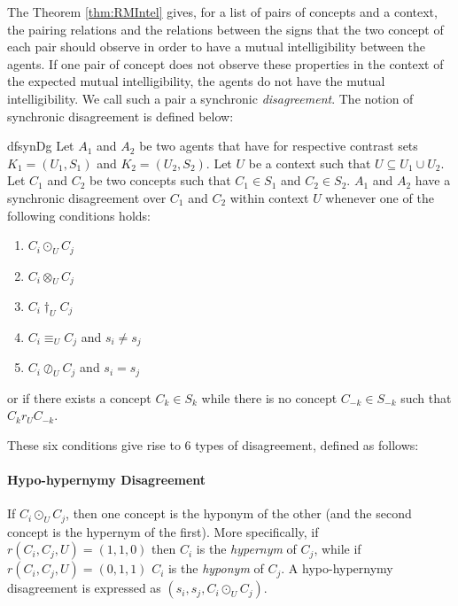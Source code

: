 The Theorem \ref{thm:RMIntel} gives, for a list of pairs of concepts and a context, the pairing relations and the relations between the signs that the two concept of each pair should observe in order to have a mutual intelligibility between the agents. If one pair of concept does not observe these properties in the context of the expected mutual intelligibility, the agents do not have the mutual intelligibility. We call such a pair a synchronic \emph{disagreement}. The notion of synchronic disagreement is defined below:

\begin{restatable}{df}{synDg}
\label{def:SynDg}
Let $A_{1}$ and $A_{2}$ be two agents that have for respective contrast sets $K_{1} = (U_{1},S_{1})$ and $K_{2} = (U_{2},S_{2})$. Let $U$ be a context such that $U \subseteq U_{1} \cup U_{2}$. Let $C_{1}$ and $C_{2}$ be two concepts such that $C_{1} \in S_{1}$ and $C_{2} \in S_{2}$. $A_{1}$ and $A_{2}$ have a synchronic disagreement over $C_{1}$ and $C_{2}$ within context $U$ whenever one of the following conditions holds:

\begin{enumerate}
\item $C_{i} \odot_{U} C_{j}$
\item $C_{i} \otimes_{U} C_{j}$
\item $C_{i} \dagger_{U} C_{j}$
\item $C_{i} \equiv_{U} C_{j}$ and $s_{i} \neq s_{j}$
\item $C_{i} \oslash_{U} C_{j}$ and $s_{i} = s_{j}$
\end{enumerate}

or if there exists a concept $C_{k} \in S_{k}$ while there is no concept $C_{-k} \in S_{-k}$ such that $C_{k} r_{U} C_{-k}$.

\end{restatable}


These six conditions give rise to 6 types of disagreement, defined as follows:

\paragraph{Hypo-hypernymy Disagreement} If $C_{i} \odot_{U} C_{j}$, then one concept is the  hyponym of the  other (and the second concept is the hypernym of the first). More specifically, if $r(C_{i},C_{j},U) = (1,1,0)$ then $C_{i}$ is the \emph{hypernym} of $C_{j}$, while if $r(C_{i},C_{j},U) = (0,1,1)$ $C_{i}$ is the \emph{hyponym} of $C_{j}$. A hypo-hypernymy disagreement is expressed as $(s_{i},s_{j},C_{i} \odot_{U} C_{j})$.

